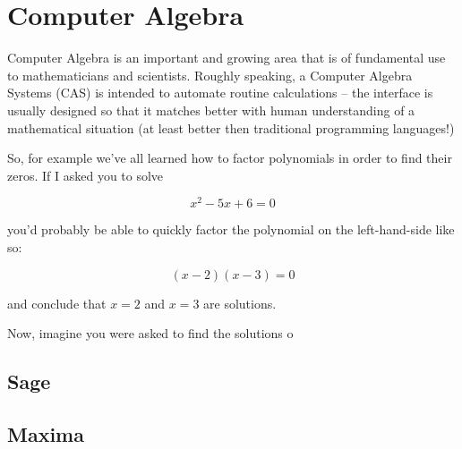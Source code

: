  
\chapter{Computer Algebra}

Computer Algebra is an important and growing area that is of fundamental use to mathematicians and scientists.  
Roughly speaking, a Computer Algebra Systems (CAS) is intended to automate routine calculations -- the interface is usually designed so that it matches better with human understanding of a mathematical situation (at least better then traditional programming languages!)  

So, for example we've all learned how to factor polynomials in order to find their zeros.  If I asked you to solve

\[ x^2 - 5x + 6 = 0 \]

\noindent you'd probably be able to quickly factor the polynomial on the left-hand-side like so:

\[ (x-2)(x-3) = 0 \]

\noindent and conclude that $x=2$ and $x=3$ are solutions.

Now, imagine you were asked to find the solutions o
\section{Sage}
\label{sec:sage}


\section{Maxima}
\label{sec:maxima}


